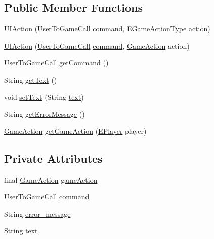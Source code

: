 \subsection*{Public Member Functions}
\begin{DoxyCompactItemize}
\item 
\mbox{\hyperlink{classui_1_1_u_i_action_a7dd1469b824c4a4d3d4a04e5c0e66709}{U\+I\+Action}} (\mbox{\hyperlink{enumui_1_1commands_1_1_user_to_game_call}{User\+To\+Game\+Call}} \mbox{\hyperlink{classui_1_1_u_i_action_ae59252bc304d98120bf7eecd3cedcaca}{command}}, \mbox{\hyperlink{enumrule_engine_1_1_e_game_action_type}{E\+Game\+Action\+Type}} action)
\item 
\mbox{\hyperlink{classui_1_1_u_i_action_a46c2d54f12814fc80f84c2becae3f748}{U\+I\+Action}} (\mbox{\hyperlink{enumui_1_1commands_1_1_user_to_game_call}{User\+To\+Game\+Call}} \mbox{\hyperlink{classui_1_1_u_i_action_ae59252bc304d98120bf7eecd3cedcaca}{command}}, \mbox{\hyperlink{classrule_engine_1_1_game_action}{Game\+Action}} action)
\item 
\mbox{\hyperlink{enumui_1_1commands_1_1_user_to_game_call}{User\+To\+Game\+Call}} \mbox{\hyperlink{classui_1_1_u_i_action_ac7b5e31f70cc4b49fad7e9d08b82e783}{get\+Command}} ()
\item 
String \mbox{\hyperlink{classui_1_1_u_i_action_a3712585143fbf58005d55618b813026f}{get\+Text}} ()
\item 
void \mbox{\hyperlink{classui_1_1_u_i_action_aa2b9a2f369994d628cb701d5dbc50698}{set\+Text}} (String \mbox{\hyperlink{classui_1_1_u_i_action_ac388713a53d076e056461616ec56f0eb}{text}})
\item 
String \mbox{\hyperlink{classui_1_1_u_i_action_a2fefd7ed6431b92c2215776bf64552b0}{get\+Error\+Message}} ()
\item 
\mbox{\hyperlink{classrule_engine_1_1_game_action}{Game\+Action}} \mbox{\hyperlink{classui_1_1_u_i_action_a3185db453138fe37b085f1427f7aca62}{get\+Game\+Action}} (\mbox{\hyperlink{enumgame_1_1_e_player}{E\+Player}} player)
\end{DoxyCompactItemize}
\subsection*{Private Attributes}
\begin{DoxyCompactItemize}
\item 
final \mbox{\hyperlink{classrule_engine_1_1_game_action}{Game\+Action}} \mbox{\hyperlink{classui_1_1_u_i_action_a470f710a9e5ba460ca6926158974e5df}{game\+Action}}
\item 
\mbox{\hyperlink{enumui_1_1commands_1_1_user_to_game_call}{User\+To\+Game\+Call}} \mbox{\hyperlink{classui_1_1_u_i_action_ae59252bc304d98120bf7eecd3cedcaca}{command}}
\item 
String \mbox{\hyperlink{classui_1_1_u_i_action_a92b8841c1eaa4157ab4e476b698b6378}{error\+\_\+message}}
\item 
String \mbox{\hyperlink{classui_1_1_u_i_action_ac388713a53d076e056461616ec56f0eb}{text}}
\end{DoxyCompactItemize}


